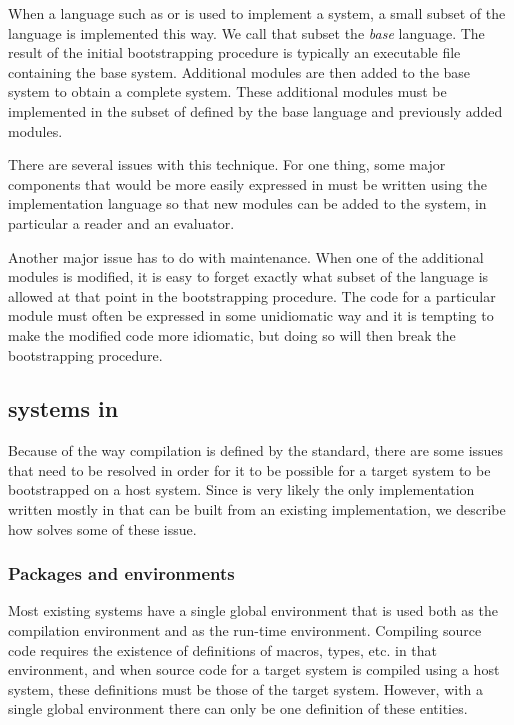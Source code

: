 When a language such as \clanguage{} or \cplusplus{} is used to
implement a \commonlisp{} system, a small subset of the \commonlisp{}
language is implemented this way.  We call that subset the \emph{base}
language.  The result of the initial bootstrapping procedure is
typically an executable file containing the base system.  Additional
modules are then added to the base system to obtain a complete
\commonlisp{} system.  These additional modules must be implemented in
the subset of \commonlisp{} defined by the base language and
previously added modules.

There are several issues with this technique.  For one thing, some
major components that would be more easily expressed in \commonlisp{}
must be written using the implementation language so that new modules
can be added to the system, in particular a reader and an evaluator.

Another major issue has to do with maintenance.  When one of the
additional modules is modified, it is easy to forget exactly what
subset of the \commonlisp{} language is allowed at that point in the
bootstrapping procedure.  The code for a particular module must often be
expressed in some unidiomatic way and it is tempting to make the
modified code more idiomatic, but doing so will then break the
bootstrapping procedure.

\subsection{\commonlisp{} systems in \commonlisp{}}
\label{sec-cl-in-cl}

Because of the way compilation is defined by the \commonlisp{}
standard, there are some issues that need to be resolved in order for
it to be possible for a target \commonlisp{} system to be bootstrapped
on a host \commonlisp{} system.  Since \sbcl{} is very likely the only
\commonlisp{} implementation written mostly in \commonlisp{} that can
be built from an existing \commonlisp{} implementation, we describe
how \sbcl{} solves some of these issue.

\subsubsection{Packages and environments}
\label{sec-cl-in-cl}

Most existing \commonlisp{} systems have a single global environment
that is used both as the compilation environment and as the run-time
environment.  Compiling \commonlisp{} source code requires the
existence of definitions of macros, types, etc. in that environment,
and when source code for a target \commonlisp{} system is compiled
using a host \commonlisp{} system, these definitions must be those of
the target system.  However, with a single global environment there
can only be one definition of these entities.

